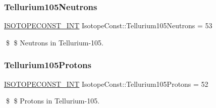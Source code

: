 \subsubsection{\texorpdfstring{Tellurium105\+Neutrons}{Tellurium105Neutrons}}
{\footnotesize\ttfamily \mbox{\hyperlink{group___isotope_const-_macros_ga5f18360b3e99483a35c32d789e62621c}{I\+S\+O\+T\+O\+P\+E\+C\+O\+N\+S\+T\+\_\+\+I\+NT}} Isotope\+Const\+::\+Tellurium105\+Neutrons = 53}

\$ \$ Neutrons in Tellurium-\/105. \mbox{\label{group___isotope_const-_tellurium-_te105_ga616f9ddc6b305c972e556a6557a552e6}} 
\subsubsection{\texorpdfstring{Tellurium105\+Protons}{Tellurium105Protons}}
{\footnotesize\ttfamily \mbox{\hyperlink{group___isotope_const-_macros_ga5f18360b3e99483a35c32d789e62621c}{I\+S\+O\+T\+O\+P\+E\+C\+O\+N\+S\+T\+\_\+\+I\+NT}} Isotope\+Const\+::\+Tellurium105\+Protons = 52}

\$ \$ Protons in Tellurium-\/105. 